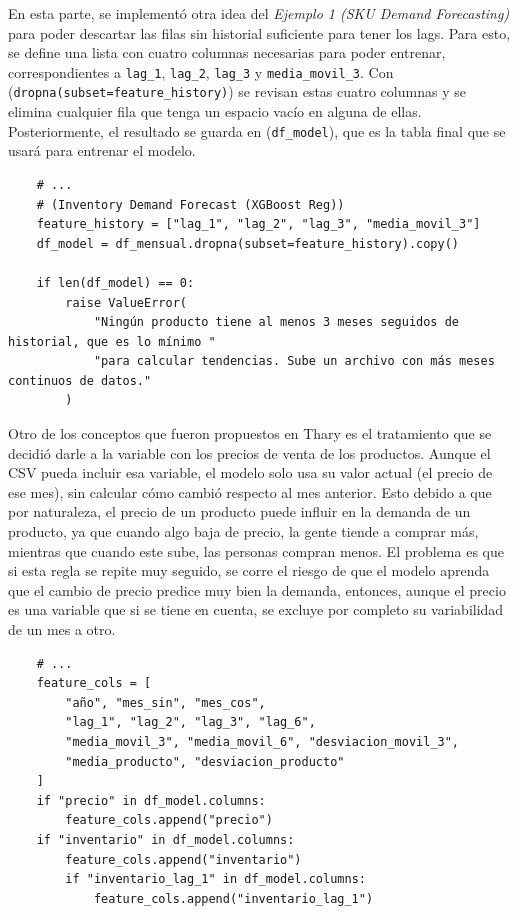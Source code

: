 En esta parte, se implementó otra idea del \textit{Ejemplo 1 (SKU Demand Forecasting)} \cite{ejemplo1_demandforecast} para poder descartar las filas sin historial suficiente para tener los lags. Para esto, se define una lista con cuatro columnas necesarias para poder entrenar, correspondientes a \texttt{lag\_1}, \texttt{lag\_2}, \texttt{lag\_3} y \texttt{media\_movil\_3}. Con (\texttt{dropna(subset=feature\_history)}) se revisan estas cuatro columnas y se elimina cualquier fila que tenga un espacio vacío en alguna de ellas. Posteriormente, el resultado se guarda en (\texttt{df\_model}), que es la tabla final que se usará para entrenar el modelo.

\label{lst:features_dropna}
\begin{verbatim}
    # ...
    # (Inventory Demand Forecast (XGBoost Reg))
    feature_history = ["lag_1", "lag_2", "lag_3", "media_movil_3"]
    df_model = df_mensual.dropna(subset=feature_history).copy()

    if len(df_model) == 0:
        raise ValueError(
            "Ningún producto tiene al menos 3 meses seguidos de historial, que es lo mínimo "
            "para calcular tendencias. Sube un archivo con más meses continuos de datos."
        )
\end{verbatim}

Otro de los conceptos que fueron propuestos en Thary es el tratamiento que se decidió darle a la variable con los precios de venta de los productos. Aunque el CSV pueda incluir esa variable, el modelo solo usa su valor actual (el precio de ese mes), sin calcular cómo cambió respecto al mes anterior. Esto debido a que por naturaleza, el precio de un producto puede influir en la demanda de un producto, ya que cuando algo baja de precio, la gente tiende a comprar más, mientras que cuando este sube, las personas compran menos. El problema es que si esta regla se repite muy seguido, se corre el riesgo de que el modelo aprenda que el cambio de precio predice muy bien la demanda, entonces, aunque el precio es una variable que si se tiene en cuenta, se excluye por completo su variabilidad de un mes a otro.  

\label{lst:features_lista}
\begin{verbatim}
    # ...
    feature_cols = [
        "año", "mes_sin", "mes_cos",
        "lag_1", "lag_2", "lag_3", "lag_6",
        "media_movil_3", "media_movil_6", "desviacion_movil_3",
        "media_producto", "desviacion_producto"
    ]
    if "precio" in df_model.columns:
        feature_cols.append("precio")
    if "inventario" in df_model.columns:
        feature_cols.append("inventario")
        if "inventario_lag_1" in df_model.columns:
            feature_cols.append("inventario_lag_1")
\end{verbatim}

